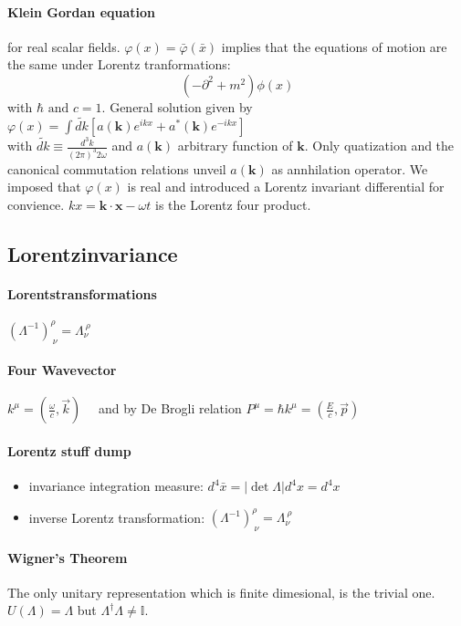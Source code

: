 \paragraph{Klein Gordan equation} for real scalar fields. $\varphi (x) = \bar{\varphi}(\bar{x})$ implies that the equations of motion are the same under Lorentz tranformations:
$$ (- \partial^2 + m^2)\phi(x)$$ with $\hbar \text{ and } c = 1$.
General solution given by $\varphi(x)=\int \widetilde{d k}\left[a(\mathbf{k}) e^{i k x}+a^*(\mathbf{k}) e^{-i k x}\right]$\\
with $ \widetilde{d k} \equiv \frac{d^3 k}{(2 \pi)^3 2 \omega}$ and $a(\mathbf{k})$ arbitrary function of $\mathbf{k}$. Only quatization and the canonical commutation relations unveil $a(\mathbf{k})$ as annhilation operator. 
We imposed that $\varphi(x)$ is real and introduced a Lorentz invariant differential for convience. $k x=\mathbf{k} \cdot \mathbf{x}-\omega t$ is the Lorentz four product. 

\subsection{Lorentzinvariance}


\paragraph{Lorentstransformations} $\left(\Lambda^{-1}\right)_{\ \nu}^\rho=\Lambda_\nu^{\ \rho}$

\paragraph{Four Wavevector} $k^\mu = \left(\frac{\omega}{c}, \vec{k}\right) \quad$ and by De Brogli relation $P^\mu = \hbar k^\mu = \left(\frac{E}{c}, \vec{p}\right)$

\paragraph{Lorentz stuff dump}
\begin{itemize}
  \item invariance integration measure: $d^4 \bar{x}=|\operatorname{det} \Lambda| d^4 x=d^4 x$
  \item inverse Lorentz transformation: $\left(\Lambda^{-1}\right)_{\ \nu}^\rho=\Lambda_\nu^{\ \rho}$
\end{itemize}



\paragraph{Wigner's Theorem} The only unitary representation which is finite dimesional, is the trivial one. $U(\Lambda) = \Lambda$ but $\Lambda^\dagger \Lambda \neq \mathbb{I}$.

